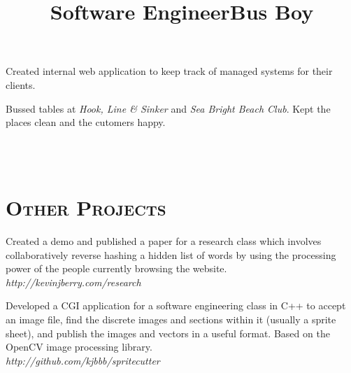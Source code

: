 \begin{resume}
\title{Software Engineer}
\begin{position}
Created internal web application to keep track of managed systems for their
clients.
\end{position}

\title{Bus Boy}
\begin{position}
Bussed tables at {\itshape Hook, Line \& Sinker} and {\itshape Sea Bright Beach
Club}. Kept the places clean and the cutomers happy.
\end{position}



\begin{formatb}
  \\
  \body\\
\end{formatb}

\section{\textsc{Other Projects}}

\begin{position}
Created a demo and published a paper for a research class which involves
collaboratively reverse hashing a hidden list of words by using the processing
power of the people currently browsing the website. \\
{\itshape http://kevinjberry.com/research}
\end{position}

\begin{position}
Developed a CGI application for a software engineering class in C++ to accept an
image file, find the discrete images and sections within it (usually a sprite
sheet), and publish the images and vectors in a useful format. Based on the
OpenCV image processing library. \\
{\itshape http://github.com/kjbbb/spritecutter}
\end{position}



\end{resume}
